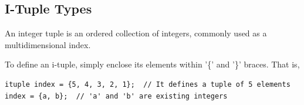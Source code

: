 \subsection*{I-Tuple Types}

An integer tuple is an ordered collection of integers, commonly used as a multidimensional index.

To define an i-tuple, simply enclose its elements within '\{' and '\}' braces. That is,

\begin{lstlisting}[language=croqtile,caption={I-Tuple Types}]
ituple index = {5, 4, 3, 2, 1};  // It defines a tuple of 5 elements
index = {a, b};  // 'a' and 'b' are existing integers
\end{lstlisting}
